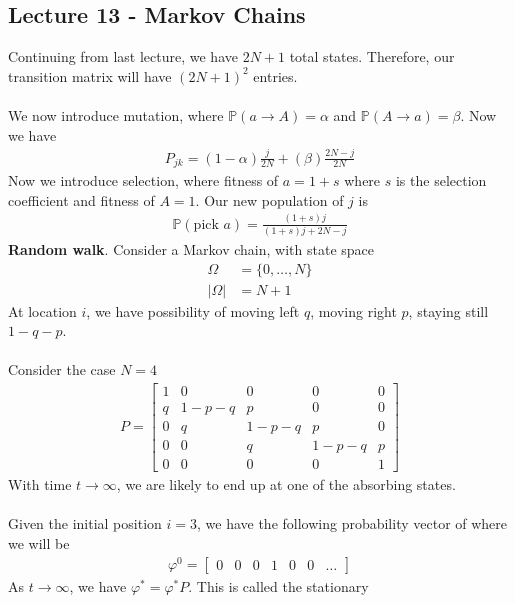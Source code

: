 \documentclass[12pt, letterpaper]{article}
\begin{document}
\subsection{Lecture 13 - Markov Chains}
Continuing from last lecture, we have $2N + 1$ total states. Therefore, our transition matrix 
will have $(2N+1)^2$ entries. \\ \\ 
We now introduce mutation, where $\mathbb{P}(a\rightarrow A) = \alpha$ and $\mathbb{P}(A\rightarrow a) = \beta$.
Now we have 
\begin{align*}
    P_{jk} = (1-\alpha) \frac{j}{2N} + (\beta) \frac{2N-j}{2N}
\end{align*}
Now we introduce selection, where fitness of $a = 1+s$ where $s$ is the selection coefficient and 
fitness of $A = 1$. Our new population of $j$ is 
\begin{align*}
    \mathbb{P}(\text{pick }a) = \frac{(1+s)j}{(1+s)j+2N-j}
\end{align*}
\textbf{Random walk}. Consider a Markov chain, with state space 
\begin{align*}
    \Omega &= \{0,\dots, N\} \\
    |\Omega| &= N+1
\end{align*}
At location $i$, we have possibility of moving left $q$, moving right $p$, staying still $1-q-p$. \\ \\
Consider the case $N = 4$
\begin{align*}
    P = 
    \begin{bmatrix}
        1 & 0 & 0 & 0 & 0\\
        q & 1- p - q & p & 0 & 0\\
        0 & q & 1-p-q & p & 0\\
        0 & 0 & q & 1-p-q & p \\
        0 & 0 & 0 & 0 & 1
    \end{bmatrix}
\end{align*}
With time $t \rightarrow \infty$, we are likely to end up at one of the absorbing states. \\ \\
Given the initial position $i = 3$, we have the following probability vector of where we will be
\begin{align*}
    \varphi^0 = \begin{bmatrix}
        0 & 0 & 0 & 1 & 0 & 0 & \dots
    \end{bmatrix}
\end{align*}
As $t \rightarrow \infty$, we have $\varphi^\ast = \varphi^\ast P$. This is called the stationary
\end{document}
